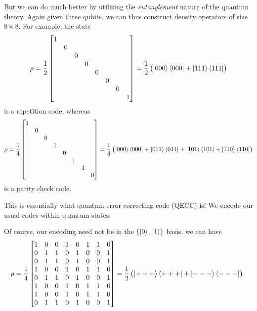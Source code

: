 But we can do much better by utilizing the \textit{entanglement} nature of the quantum theory. Again given three qubits, we can thus construct density operators of size $8\times 8$. For example, the state
\begin{equation}
    \rho = \frac{1}{2}\left[\begin{matrix}
        1 \\ & 0 \\ & & 0 \\ & & & 0 \\ & & & & 0 \\
        & & & & & 0 \\ & & & & & & 0 \\ & & & & & & & 1
    \end{matrix}\right] = \frac{1}{2} \left(\left|{000}\right\rangle\left\langle{000}\right| + \left|{111}\right\rangle\left\langle{111}\right|\right) \label{eq:w14_repetition_code_density_operator}
\end{equation}
is a repetition code, whereas
\begin{equation}
    \rho = \frac{1}{4}\left[\begin{matrix}
        1 \\ & 0 \\ & & 0 \\ & & & 1 \\ & & & & 0 \\
        & & & & & 1 \\ & & & & & & 1 \\ & & & & & & & 0
    \end{matrix}\right] = \frac{1}{4} \left(\left|{000}\right\rangle\left\langle{000}\right| + \left|{011}\right\rangle\left\langle{011}\right| + \left|{101}\right\rangle\left\langle{101}\right| + \left|{110}\right\rangle\left\langle{110}\right|\right)
\end{equation}
is a parity check code.

This is essentially what quantum error correcting code (QECC) is! We encode our usual codes within quantum states.

Of course, our encoding need not be in the $\{\left|{0}\right\rangle,\left|{1}\right\rangle\}$ basis, we can have
\begin{equation}
    \rho = \frac{1}{4}\left[\begin{matrix}
        1 & 0 & 0 & 1 & 0 & 1 & 1 & 0 \\
        0 & 1 & 1 & 0 & 1 & 0 & 0 & 1 \\
        0 & 1 & 1 & 0 & 1 & 0 & 0 & 1 \\
        1 & 0 & 0 & 1 & 0 & 1 & 1 & 0 \\
        0 & 1 & 1 & 0 & 1 & 0 & 0 & 1 \\
        1 & 0 & 0 & 1 & 0 & 1 & 1 & 0 \\
        1 & 0 & 0 & 1 & 0 & 1 & 1 & 0 \\
        0 & 1 & 1 & 0 & 1 & 0 & 0 & 1
    \end{matrix}\right] = \frac{1}{2} \left(\left|{+++}\right\rangle\left\langle{+++}\right| + \left|{---}\right\rangle\left\langle{---}\right|\right).
\end{equation}

